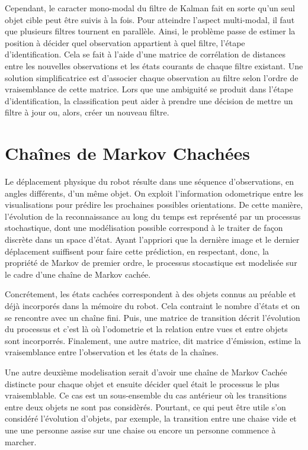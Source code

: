 Cependant, le caracter mono-modal du filtre de Kalman fait en sorte
qu'un seul objet cible peut être suivis à la fois. Pour atteindre
l'aspect multi-modal, il faut que plusieurs filtres tournent en
parallèle. Ainsi, le problème passe de estimer la position à décider
quel observation appartient à quel filtre, l'étape
d'identification. Cela se fait à l'aide d'une matrice de corrélation
de distances entre les nouvelles observations et les états courants de
chaque filtre existant. Une solution simplificatrice est d'associer
chaque observation au filtre selon l'ordre de vraisemblance de cette
matrice. Lors que une ambiguité se produit dans l'étape
d'identification, la classification peut aider à prendre une décision
de mettre un filtre à jour ou, alors, créer un nouveau filtre.

\section {Chaînes de Markov Chachées}

Le déplacement physique du robot résulte dans une séquence
d'observations, en angles différents, d'un même objet. On exploit
l'information odometrique entre les visualisations pour prédire les
prochaines possibles orientations. De cette manière, l'évolution de la
reconnaissance au long du temps est représenté par un processus
stochastique, dont une modélisation possible correspond à le traiter
de façon discrète dans un space d'état. Ayant l'appriori que la
dernière image et le dernier déplacement suiffisent pour faire cette
prédiction, en respectant, donc, la propriété de Markov de premier
ordre, le processus stocastique est modelisée sur le cadre d'une
chaîne de Markov cachée.

Concrétement, les états cachées correspondent à des objets connus au
préable et déjà incorporés dans la mémoire du robot. Cela contraint le
nombre d'états et on se rencontre avec un chaîne fini. Puis, une
matrice de transition décrit l'évolution du processus et c'est là où
l'odometrie et la relation entre vues et entre objets sont
incorporrés. Finalement, une autre matrice, dit matrice d'émission,
estime la vraisemblance entre l'observation et les états de la
chaînes.

Une autre deuxième modelisation serait d'avoir une chaîne de Markov
Cachée distincte pour chaque objet et ensuite décider quel était le
processus le plus vraisemblable. Ce cas est un sous-ensemble du cas
antérieur où les transitions entre deux objets ne sont pas
considèrés. Pourtant, ce qui peut être utile s'on considéré
l'évolution d'objets, par exemple, la transition entre une chaise vide
et une une personne assise sur une chaise ou encore un personne
commence à marcher.

